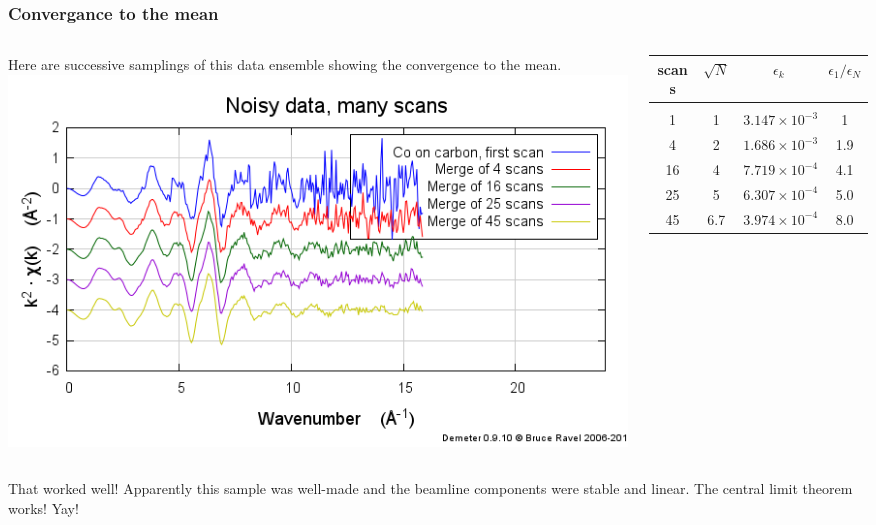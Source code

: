 \documentclass[10pt, xcolor=x11names, compress]{beamer}
\begin{document}
\begin{frame}
  \frametitle{Convergance to the mean}
  \begin{columns}
    \begin{column}{0.5\linewidth}
      Here are successive samplings of this data ensemble showing the
      convergence to the mean. \\
      \includegraphics[width=\linewidth]{images/CoGr.png}
    \end{column}
    \begin{column}{0.5\linewidth}
      \small
      \begin{tabular}[h]{cccc}
        scans & $\sqrt{N}$ & $\epsilon_k$ & $\epsilon_1/\epsilon_N$ \\
        \hline\\
        1   & 1   & $3.147\times 10^{-3}$ & 1 \\
        4   & 2   & $1.686\times 10^{-3}$ & 1.9 \\
        16  & 4   & $7.719\times 10^{-4}$ & 4.1 \\
        25  & 5   & $6.307\times 10^{-4}$ & 5.0 \\
        45  & 6.7 & $3.974\times 10^{-4}$ & 8.0
      \end{tabular}
    \end{column}
  \end{columns}
  \begin{exampleblock}{}
    That worked well!  Apparently this sample was well-made and the
    beamline components were stable and linear.  The central limit
    theorem works!  Yay!
  \end{exampleblock}
\end{frame}
\end{document}
